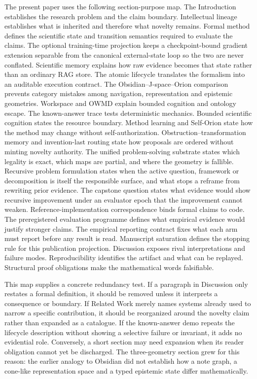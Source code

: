 The present paper uses the following section-purpose map. The Introduction establishes the research problem and the claim boundary. Intellectual lineage establishes what is inherited and therefore what novelty remains. Formal method defines the scientific state and transition semantics required to evaluate the claims. The optional training-time projection keeps a checkpoint-bound gradient extension separable from the canonical external-state loop so the two are never conflated. Scientific memory explains how raw evidence becomes that state rather than an ordinary RAG store. The atomic lifecycle translates the formalism into an auditable execution contract. The Obsidian--J-space--Orion comparison prevents category mistakes among navigation, representation and epistemic geometries. Workspace and OWMD explain bounded cognition and ontology escape. The known-answer trace tests deterministic mechanics. Bounded scientific cognition states the resource boundary. Method learning and Self-Orion state how the method may change without self-authorization. Obstruction--transformation memory and invention-last routing state how proposals are ordered without minting novelty authority. The unified problem-solving substrate states which legality is exact, which maps are partial, and where the geometry is fallible. Recursive problem formulation states when the active question, framework or decomposition is itself the responsible surface, and what stops a reframe from rewriting prior evidence. The capstone question states what evidence would show recursive improvement under an evaluator epoch that the improvement cannot weaken. Reference-implementation correspondence binds formal claims to code. The preregistered evaluation programme defines what empirical evidence would justify stronger claims. The empirical reporting contract fixes what each arm must report before any result is read. Manuscript saturation defines the stopping rule for this publication projection. Discussion exposes rival interpretations and failure modes. Reproducibility identifies the artifact and what can be replayed. Structural proof obligations make the mathematical words falsifiable.

This map supplies a concrete redundancy test. If a paragraph in Discussion only restates a formal definition, it should be removed unless it interprets a consequence or boundary. If Related Work merely names systems already used to narrow a specific contribution, it should be reorganized around the novelty claim rather than expanded as a catalogue. If the known-answer demo repeats the lifecycle description without showing a selective failure or invariant, it adds no evidential role. Conversely, a short section may need expansion when its reader obligation cannot yet be discharged. The three-geometry section grew for this reason: the earlier analogy to Obsidian did not establish how a note graph, a cone-like representation space and a typed epistemic state differ mathematically.

